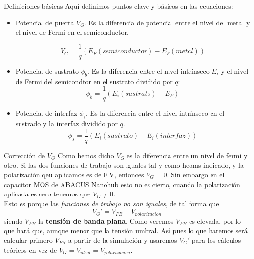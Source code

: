 \documentclass{/home/daniel/GitHub/USC-Physics-Degree-Notes/Notes/Presentacion}
\begin{document}
\begin{frame}{Definiciones básicas}
    Aquí definimos puntos clave y básicos en las ecuaciones: 
    \begin{itemize}
        \item Potencial de puerta $V_G$. Es la diferencia de potencial entre el nivel del metal y el nivel de Fermi en el semiconductor. 
        
        \begin{equation*}
            V_G = \frac{1}{q} (E_F(semiconductor) - E_F(metal))
        \end{equation*}

        \item Potencial de sustrato $\phi_b$. Es la diferencia entre el nivel intrínseco $E_i$ y el nivel de Fermi del semicondtor en el sustrato dividido por $q$:
        \begin{equation*}
            \phi_b = \frac{1}{q} (E_i (sustrato) - E_F)
        \end{equation*}
        \item Potencial de interfaz $\phi_s$. Es la diferencia entre el nivel intrínseco en el sustrado y la interfaz dividido por $q$. 
        \begin{equation*}
            \phi_s = \frac{1}{q} (E_i (sustrato) - E_i(interfaz))
        \end{equation*}
    \end{itemize}
\end{frame}

\begin{frame}{Corrección de $V_G$}
    Como hemos dicho $V_G$ es la diferencia entre un nivel de fermi y otro. Si las dos funciones de trabajo son iguales tal y como heoms indicado, y la polarización qeu aplicamos es de 0 V, entonces $V_G=0$. Sin embargo en el capacitor MOS de ABACUS Nanohub esto no es cierto, cuando la polarización aplicada es cero tenemos que $V_G \neq 0$. \\
    
    Esto es porque las \textit{funciones de trabajo no son iguales}, de tal forma que 
    \begin{equation*}
        V_G'  = V_{FB} + V_{polarizacion} 
    \end{equation*}
    siendo $V_{FB}$ la \textbf{tensión de banda plana}. Como veremos $V_{FB}$ es elevada, por lo que hará que, aunque menor que la tensión umbral. Así pues lo que haremos será calcular primero $V_{FB}$ a partir de la simulación y usaremos $V_G'$ para los cálculos teóricos en vez de $V_G=V_{ideal}  = V_{polarizacion}$.
\end{frame}
\end{document}
